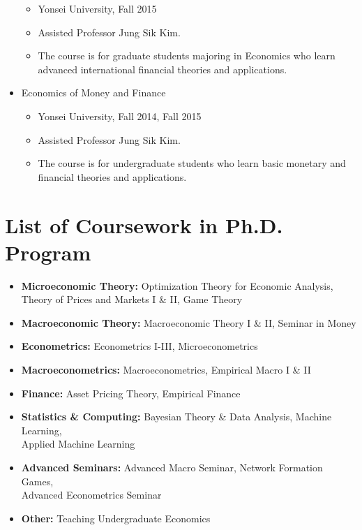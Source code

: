 \documentclass[11pt,a4paper]{article}
\begin{document}
\begin{itemize}[leftmargin=*]
    \begin{itemize}[leftmargin=*]
        \item Yonsei University, Fall 2015
        \item Assisted Professor Jung Sik Kim.
        \item The course is for graduate students majoring in Economics who learn advanced international financial theories and applications.
    \end{itemize}    
\item Economics of Money and Finance
    \begin{itemize}[leftmargin=*]
        \item Yonsei University, Fall 2014, Fall 2015
        \item Assisted Professor Jung Sik Kim.
        \item The course is for undergraduate students who learn basic monetary and financial theories and applications.
    \end{itemize}
\end{itemize}

\vspace{5mm}


\section*{List of Coursework in Ph.D. Program}
\begin{itemize}[leftmargin=*, align=left]  
    \raggedright
    \item \textbf{Microeconomic Theory:} Optimization Theory for Economic Analysis, \\ Theory of Prices and Markets I \& II, Game Theory
    \item \textbf{Macroeconomic Theory:} Macroeconomic Theory I \& II, Seminar in Money
    \item \textbf{Econometrics:} Econometrics I-III,  Microeconometrics
    \item \textbf{Macroeconometrics:} Macroeconometrics, Empirical Macro I \& II
    \item \textbf{Finance:} Asset Pricing Theory, Empirical Finance
    \item \textbf{Statistics \& Computing:} Bayesian Theory \& Data Analysis, Machine Learning,\\  Applied Machine Learning
    \item \textbf{Advanced Seminars:} Advanced Macro Seminar, Network Formation Games, \\  Advanced Econometrics Seminar
    \item \textbf{Other:} Teaching Undergraduate Economics
\end{itemize}
\vspace{5mm}
\end{document}
